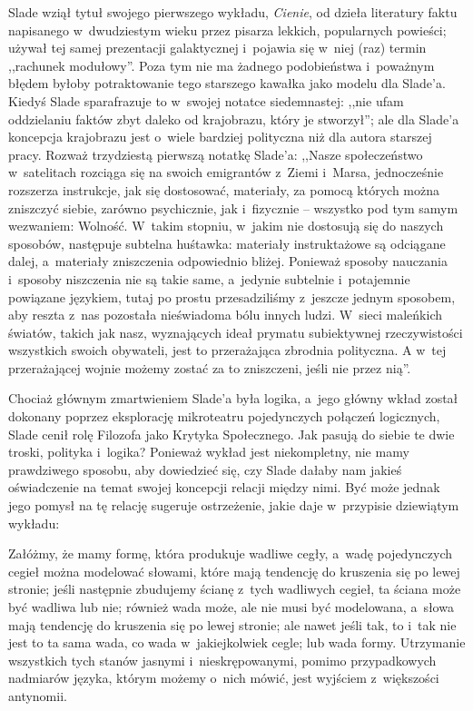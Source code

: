 \documentclass[oneside,polish,11pt,rmheadings]{mwbk}
\begin{document}
Slade wziął tytuł swojego pierwszego wykładu, \textit{Cienie}, od dzieła literatury faktu napisanego w~dwudziestym wieku przez pisarza lekkich, popularnych powieści; używał tej samej prezentacji galaktycznej i~pojawia się w~niej (raz) termin ,,rachunek modułowy''. Poza tym nie ma żadnego podobieństwa i~poważnym błędem byłoby potraktowanie tego starszego kawałka jako modelu dla Slade'a. Kiedyś Slade sparafrazuje to w~swojej notatce siedemnastej:  ,,nie ufam oddzielaniu faktów zbyt daleko od krajobrazu, który je stworzył''; ale dla Slade'a koncepcja krajobrazu jest o~wiele bardziej polityczna niż dla autora starszej pracy. Rozważ trzydziestą pierwszą notatkę Slade'a: ,,Nasze społeczeństwo w~satelitach rozciąga się na swoich emigrantów z~Ziemi i~Marsa, jednocześnie rozszerza instrukcje, jak się dostosować, materiały, za pomocą których można zniszczyć siebie, zarówno psychicznie, jak i~fizycznie -- wszystko pod tym samym wezwaniem: Wolność. W~takim stopniu, w~jakim nie dostosują się do naszych sposobów, następuje subtelna huśtawka: materiały instruktażowe są odciągane dalej, a~materiały zniszczenia odpowiednio bliżej. Ponieważ sposoby nauczania i~sposoby niszczenia nie są takie same, a~jedynie subtelnie i~potajemnie powiązane językiem, tutaj po prostu przesadziliśmy z~jeszcze jednym sposobem, aby reszta z~nas pozostała nieświadoma bólu innych ludzi. W~sieci maleńkich światów, takich jak nasz, wyznających ideał prymatu subiektywnej rzeczywistości wszystkich swoich obywateli, jest to przerażająca zbrodnia polityczna. A w~tej przerażającej wojnie możemy zostać za to zniszczeni, jeśli nie przez nią''. 

Chociaż głównym zmartwieniem Slade'a była logika, a~jego główny wkład został dokonany poprzez eksplorację mikroteatru pojedynczych połączeń logicznych, Slade cenił rolę Filozofa jako Krytyka Społecznego. Jak pasują do siebie te dwie troski,  polityka i~logika? Ponieważ wykład jest niekompletny, nie mamy prawdziwego sposobu, aby dowiedzieć się, czy Slade dałaby nam jakieś oświadczenie na temat swojej koncepcji relacji między nimi. Być może jednak jego pomysł na tę relację sugeruje ostrzeżenie, jakie daje w~przypisie dziewiątym wykładu: 

Załóżmy, że mamy formę, która produkuje wadliwe cegły, a~wadę pojedynczych cegieł można modelować słowami, które mają tendencję do kruszenia się po lewej stronie; jeśli następnie zbudujemy ścianę z~tych wadliwych cegieł, ta ściana może być wadliwa lub nie; również wada może, ale nie musi być modelowana, a~słowa mają tendencję do kruszenia się po lewej stronie; ale nawet jeśli tak, to i~tak nie jest to ta sama wada, co wada w~jakiejkolwiek cegle; lub wada formy. Utrzymanie wszystkich tych stanów jasnymi i~nieskrępowanymi, pomimo przypadkowych nadmiarów języka, którym możemy o~nich mówić, jest wyjściem z~większości antynomii. 
\end{document}
